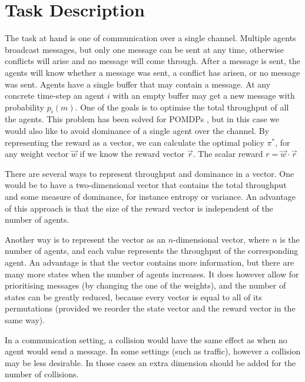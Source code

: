 \documentclass{article}
\begin{document}
	\maketitle
	\section{Task Description}
	\label{sec:task_description}
		The task at hand is one of communication over a single channel.
		Multiple agents broadcast messages, but only one message can be sent at
		any time, otherwise conflicts will arise and no message will come
		through. After a message is sent, the agents will know whether a message
		was sent, a conflict has arisen, or no message was sent.
		Agents have a single buffer that may contain a message. At any concrete
		time-step an agent $i$ with an empty buffer may get a new message with
		probability $p_i(m)$.
		One of the goals is to optimise the total throughput of all the agents.
		This problem has been solved for POMDPs \cite{ooi1996decentralized}, but in this case we would
		also like to avoid dominance of a single agent over the channel.
		By representing the reward as a vector, we can calculate the optimal
		policy $\pi^*$, for any weight vector $\vec{w}$ if we know the reward
		vector $\vec{r}$. The scalar reward $r = \vec{w} \cdot \vec{r}$

		There are several ways to represent throughput and dominance in a
		vector. One would be to have a two-dimensional vector that contains the
		total throughput and some measure of dominance, for instance entropy or
		variance. An advantage of this approach is that the size of the reward
		vector is independent of the number of agents.

		Another way is to represent the vector as an $n$-dimensional vector,
		where $n$ is the number of agents, and each value represents the
		throughput of the corresponding agent. An advantage is that the vector
		contains more information, but there are many more states when the number
		of agents increases. It does however allow for prioritising messages (by
		changing the one of the weights), and the number of states can be greatly
		reduced, because every vector is equal to all of its permutations
		(provided we reorder the state vector and the reward vector in the same
		way).

		In a communication setting, a collision would have the same effect as
		when no agent would send a message. In some settings (such as traffic),
		however a collision may be less desirable. In those cases an extra
		dimension should be added for the number of collisions.
		
		
\end{document}
